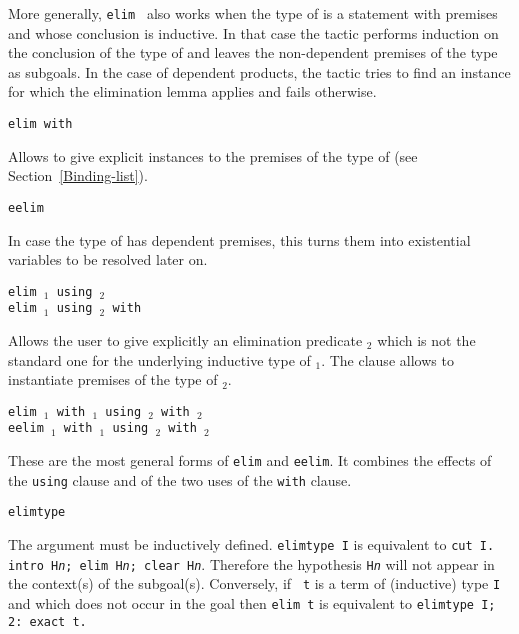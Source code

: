 \begin{Variants}
  More generally, {\tt elim \term} also works when the type of {\term}
  is a statement with premises and whose conclusion is inductive.  In
  that case the tactic performs induction on the conclusion of the
  type of {\term} and leaves the non-dependent premises of the type as
  subgoals.  In the case of dependent products, the tactic tries to
  find an instance for which the elimination lemma applies and fails
  otherwise.

\item {\tt elim {\term} with {\bindinglist}}
  
  Allows to give explicit instances to the premises of the type
  of {\term} (see Section~\ref{Binding-list}).

\item{\tt eelim {\term}}

  In case the type of {\term} has dependent premises, this turns them into
  existential variables to be resolved later on.

\item{\tt elim {\term$_1$} using {\term$_2$}}\\
     {\tt elim {\term$_1$} using {\term$_2$} with {\bindinglist}}

Allows the user to give explicitly an elimination predicate
{\term$_2$} which is not the standard one for the underlying inductive
type of {\term$_1$}. The {\bindinglist} clause allows to
instantiate premises of the type of {\term$_2$}.

\item{\tt elim {\term$_1$} with {\bindinglist$_1$} using {\term$_2$} with {\bindinglist$_2$}}\\
     {\tt eelim {\term$_1$} with {\bindinglist$_1$} using {\term$_2$} with {\bindinglist$_2$}}

  These are the most general forms of {\tt elim} and {\tt eelim}.  It
  combines the effects of the {\tt using} clause and of the two uses
  of the {\tt with} clause.

\item {\tt elimtype \form}
  
  The argument {\form} must be inductively defined. {\tt elimtype I}
  is equivalent to {\tt cut I. intro H{\rm\sl n}; elim H{\rm\sl n};
    clear H{\rm\sl n}}. Therefore the hypothesis {\tt H{\rm\sl n}} will
  not appear in the context(s) of the subgoal(s).  Conversely, if {\tt
    t} is a term of (inductive) type {\tt I} and which does not occur
  in the goal then {\tt elim t} is equivalent to {\tt elimtype I; 2:
    exact t.}


\end{Variants}
